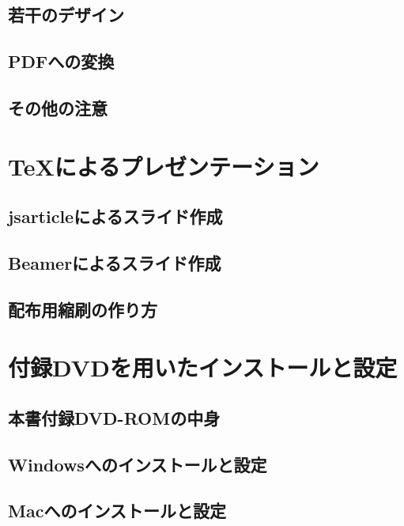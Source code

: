 \documentclass{jsbook}
\begin{document}
\section{若干のデザイン}

\section{PDFへの変換}

\section{その他の注意}

\chapter{TeXによるプレゼンテーション}

\section{jsarticleによるスライド作成}

\section{Beamerによるスライド作成}

\section{配布用縮刷の作り方}

\appendix

\chapter{付録DVDを用いたインストールと設定}

\section{本書付録DVD-ROMの中身}

\section{Windowsへのインストールと設定}

\section{Macへのインストールと設定}
\end{document}
